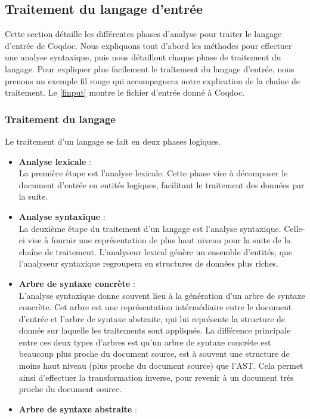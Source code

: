 \documentclass[a4paper, 11pt]{report}
\begin{document}
    \subsection{Traitement du langage d'entrée}
    Cette section détaille les différentes phases d'analyse pour traiter le
    langage d'entrée de Coqdoc. Nous expliquons tout d'abord les méthodes
    pour effectuer une analyse syntaxique, puis nous détaillont chaque phase
    de traitement du langage.
    Pour expliquer plus facilement le traîtement du langage d'entrée, nous
    prenons un exemple fil rouge qui accompagnera notre explication de la
    chaîne de traitement. Le \cref{finput} montre le fichier d'entrée
    donné à Coqdoc.
    

    \subsubsection{Traitement du langage}
    \label{trait}
    Le traitement d'un langage se fait en deux phases logiques.
    \begin{itemize}
    \item[] \textbf{Analyse lexicale}  :\\
      La première étape est l'analyse lexicale. Cette phase vise à décomposer
      le document d'entrée en entités logiques, facilitant le traitement
      des données par la suite.
    \item[] \textbf{Analyse syntaxique} :\\
      La deuxième étape du traitement d'un langage est l'analyse syntaxique.
      Celle-ci vise à fournir une représentation de plus haut niveau pour
      la suite de la chaîne de traitement. L'analyseur lexical génère un
      ensemble d'entités, que l'analyseur syntaxique regroupera en structures
      de données plus riches.
      \item[] \textbf{Arbre de syntaxe concrète} :\\
      L'analyse syntaxique donne souvent lieu à la génération d'un arbre
      de syntaxe concrète. Cet arbre est une représentation intérmédiaire
      entre le document d'entrée et l'arbre de syntaxe abstraite, qui
      lui représente la structure de donnée sur laquelle les traitements sont
      appliqués. La différence principale entre ces deux types d'arbres est
      qu'un arbre de syntaxe concrète est beaucoup plus proche du document
      source, est à souvent une structure de moins haut niveau (plus proche du
      document source) que l'AST.  Cela permet ainsi d'effectuer la
      transformation inverse, pour revenir à un document très proche du
      document source.
      \item[] \textbf{Arbre de syntaxe abstraite} :\\
    \end{itemize}
\end{document}
